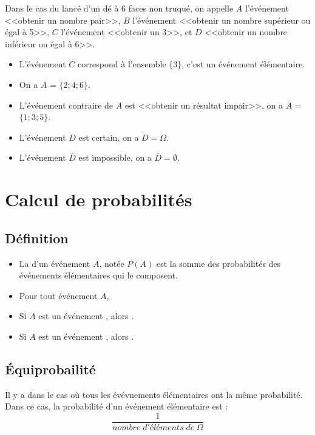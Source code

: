 \documentclass[12pt,a4paper]{article}
\begin{document}
\begin{myex}
	Dans le cas du lancé d'un dé à 6 faces non truqué, on appelle $A$ l'événement <<obtenir un nombre pair>>, $B$ l'événement <<obtenir un nombre supérieur ou égal à 5>>, $C$ l'événement <<obtenir un 3>>, et $D$ <<obtenir un nombre inférieur ou égal à 6>>.
	\begin{itemize}
		\item L'événement $C$ correspond à l'ensemble $\{3\}$, c'est un événement élémentaire.
		\item On a $A$ = $\{2;4;6\}$.
		\item L'événement contraire de $A$ est <<obtenir un résultat impair>>, on a $\bar{A} $ = $\{1;3;5\}$.
		\item L'événement  $D$ est certain, on a $D=\Omega$.
		\item L'événement $\bar{D}$ est impossible, on a $\bar{D} = \emptyset$.
	\end{itemize}
\end{myex}

\section{Calcul de probabilités}

\subsection{Définition}

\begin{mydef}
	\begin{itemize}
		\item La  d'un événement $A$, notée $P(A)$ est la somme des probabilités des événements élémentaires qui le composent.
		\item Pour tout événement $A$, 
		\item Si $A$ est un événement , alors .
		\item Si $A$ est un événement , alors .
	\end{itemize}
	
\end{mydef}


\subsection{\'Equiprobailité}


\begin{mybilan}
	
		Il y a  dans le cas où tous les évévnements élémentaires ont la même probabilité.
		Dans ce cas, la probabilité d'un événement élémentaire est :
		\begin{equation*}
			\dfrac{1}{nombre\; d'éléments\; de\; \Omega}
		\end{equation*}


\end{mybilan}
\end{document}
